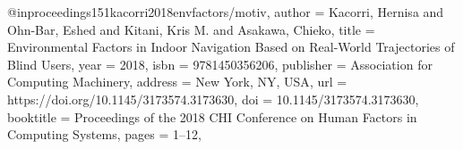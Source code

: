 @inproceedings{151kacorri2018envfactors/motiv,
author = {Kacorri, Hernisa and Ohn-Bar, Eshed and Kitani, Kris M. and Asakawa, Chieko},
title = {Environmental Factors in Indoor Navigation Based on Real-World Trajectories of Blind Users},
year = {2018},
isbn = {9781450356206},
publisher = {Association for Computing Machinery},
address = {New York, NY, USA},
url = {https://doi.org/10.1145/3173574.3173630},
doi = {10.1145/3173574.3173630},
booktitle = {Proceedings of the 2018 CHI Conference on Human Factors in Computing Systems},
pages = {1–12},
}